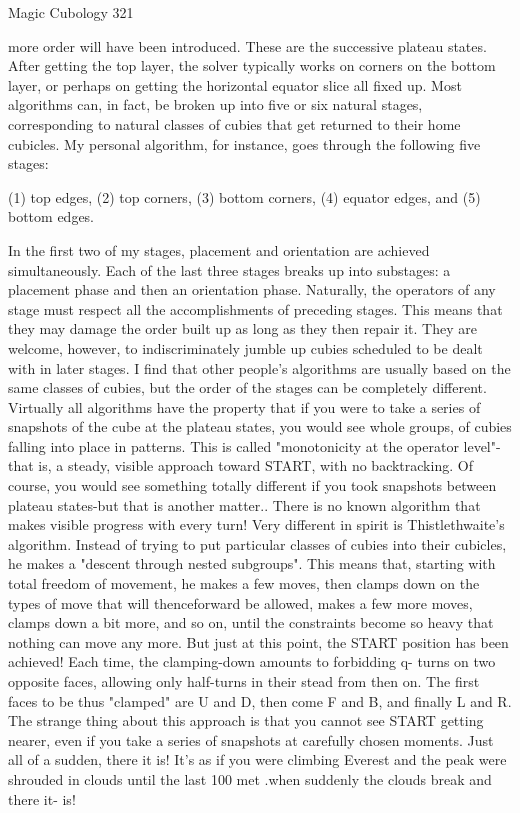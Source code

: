 Magic Cubology                                                                        321

more order will have been introduced. These are the successive plateau states.
        After getting the top layer, the solver typically works on corners on the bottom
layer, or perhaps on getting the horizontal equator slice all fixed up. Most algorithms
can, in fact, be broken up into five or six natural stages, corresponding to natural
classes of cubies that get returned to their home cubicles. My personal algorithm, for
instance, goes through the following five stages:

       (1) top edges,
       (2) top corners,
       (3) bottom corners,
       (4) equator edges, and
       (5) bottom edges.

In the first two of my stages, placement and orientation are achieved simultaneously.
Each of the last three stages breaks up into substages: a placement phase and then an
orientation phase. Naturally, the operators of any stage must respect all the
accomplishments of preceding stages. This means that they may damage the order
built up as long as they then repair it. They are welcome, however, to indiscriminately
jumble up cubies scheduled to be dealt with in later stages. I find that other people's
algorithms are usually based on the same classes of cubies, but the order of the stages
can be completely different.
        Virtually all algorithms have the property that if you were to take a series of
snapshots of the cube at the plateau states, you would see whole groups, of cubies
falling into place in patterns. This is called "monotonicity at the operator level"-that
is, a steady, visible approach toward START, with no backtracking. Of course, you
would see something totally different if you took snapshots between plateau states-but
that is another matter.. There is no known algorithm that makes visible progress with
every turn!
        Very different in spirit is Thistlethwaite's algorithm. Instead of trying to put
particular classes of cubies into their cubicles, he makes a "descent through nested
subgroups". This means that, starting with total freedom of movement, he makes a
few moves, then clamps down on the types of move that will thenceforward be
allowed, makes a few more moves, clamps down a bit more, and so on, until the
constraints become so heavy that nothing can move any more. But just at this point,
the START position has been achieved! Each time, the clamping-down amounts to
forbidding q- turns on two opposite faces, allowing only half-turns in their stead from
then on. The first faces to be thus "clamped" are U and D, then come F and B, and
finally L and R. The strange thing about this approach is that you cannot see START
getting nearer, even if you take a series of snapshots at carefully chosen moments.
Just all of a sudden, there it is! It's as if you were climbing Everest and the peak were
shrouded in clouds until the last 100 met .when suddenly the clouds break and there
it- is!




